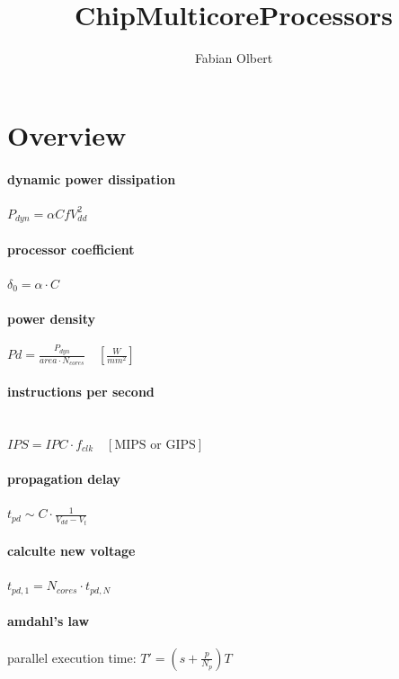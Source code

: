 \documentclass[8pt]{extarticle}
\title{ChipMulticoreProcessors}
\author{Fabian Olbert}                    %
\newcommand{\coloreq}[1]{\colorbox{nordicRed}{\(\displaystyle #1\)}}
\begin{document}
\setlength{\columnseprule}{0.2pt}

\begin{multicols*}{4}


\noindent
{\Large\scshape\color{catBlue}\inserttitle} %

\section{Overview}


\paragraph{dynamic power dissipation} \coloreq{{P_{dyn} = \alpha C f V_{dd}^2}}

\paragraph{processor coefficient} \coloreq{\delta_0 = \alpha \cdot C}

\paragraph{power density} \coloreq{ Pd = \frac{P_{dyn}}{area \cdot N_{cores}} \quad [\frac{W}{mm^2}]}

\paragraph{instructions per second} \mbox{} \\ 
\indent \coloreq{ IPS = IPC \cdot f_{clk} \quad [\text{MIPS or GIPS}]}

\paragraph{propagation delay} \coloreq{t_{pd} \sim C \cdot \frac{1}{V_{dd} - V_t}} 

\paragraph{calculte new voltage} \coloreq{t_{pd,1} = N_{cores} \cdot t_{pd,N}}

\paragraph{amdahl's law} parallel execution time: \newline 
\indent\coloreq{T' = (s + \frac{p}{N_p}) T}



\end{multicols*}
\end{document}
